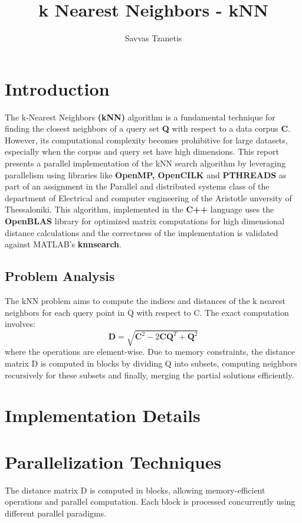 \documentclass[12pt]{report}
\begin{document}
\title{\textbf{k Nearest Neighbors - kNN}}
\author{Savvas Tzanetis}
\maketitle

\tableofcontents

\chapter{Introduction}
The k-Nearest Neighbors \textbf{(kNN)} algorithm is a fundamental technique for finding the closest neighbors of a query set \textbf{Q} with respect to a data corpus \textbf{C}. However, its computational complexity becomes prohibitive for large datasets, especially when the corpus and query set have high dimensions. This report presents a parallel implementation of the kNN search algorithm by leveraging parallelism using libraries like \textbf{OpenMP, OpenCILK} and \textbf{PTHREADS} as part of an assignment in the Parallel and distributed systems class of the department of Electrical and computer engineering of the Aristotle unversity of Thessaloniki. This algorithm, implemented in the \textbf{C++} language uses the \textbf{OpenBLAS} library for optimized matrix computations for high dimensional distance calculations and the correctness of the implementation is validated against MATLAB's \textbf{knnsearch}.

\section{Problem Analysis}
The kNN problem aims to compute the indices and distances of the k nearest neighbors for each query point in Q with respect to C. The exact computation involves:
\[
\bm{D} = \sqrt{\bm{C}^2 - 2\bm{C}\bm{Q}^T + \bm{Q}^2}
\]
where the operations are element-wise.
Due to memory constraints, the distance matrix D is computed in blocks by dividing Q into subsets, computing neighbors recursively for these subsets and finally, merging the partial solutions efficiently.

\chapter{Implementation Details}

\chapter{Parallelization Techniques}
The distance matrix D is computed in blocks, allowing memory-efficient operations and parallel computation. Each block is processed concurrently using different parallel paradigms.
\end{document}
